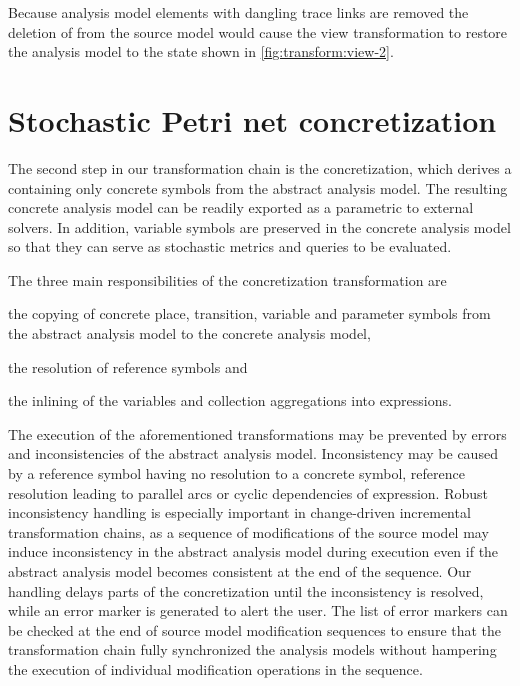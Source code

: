 \begin{runningExample}
  Because analysis model elements with dangling trace links are removed the deletion of  from the source model would cause the view transformation to restore the analysis model to the state shown in \cref{fig:transform:view-2}.
\end{runningExample}

\section{Stochastic Petri net concretization}
\label{chap:transform:concretizer}

The second step in our transformation chain is the concretization, which derives a  containing only concrete symbols from the abstract analysis model. The resulting concrete analysis model can be readily exported as a parametric  to external solvers. In addition, variable symbols are preserved in the concrete analysis model so that they can serve as stochastic metrics and queries to be evaluated.

The three main responsibilities of the concretization transformation are
\begin{itemize*}
\item the copying of concrete place, transition, variable and parameter symbols from the abstract analysis model to the concrete analysis model,
\item the resolution of reference symbols and
\item the inlining of the variables and collection aggregations into  expressions.
\end{itemize*}

The execution of the aforementioned transformations may be prevented by errors and inconsistencies of the abstract analysis model. Inconsistency may be caused by a reference symbol having no resolution to a concrete symbol, reference resolution leading to parallel arcs or cyclic dependencies of expression. Robust inconsistency handling is especially important in change-driven incremental transformation chains, as a sequence of modifications of the source model may induce inconsistency in the abstract analysis model during execution even if the abstract analysis model becomes consistent at the end of the sequence. Our handling delays parts of the concretization until the inconsistency is resolved, while an error marker is generated to alert the user. The list of error markers can be checked at the end of source model modification sequences to ensure that the transformation chain fully synchronized the analysis models without hampering the execution of individual modification operations in the sequence.

